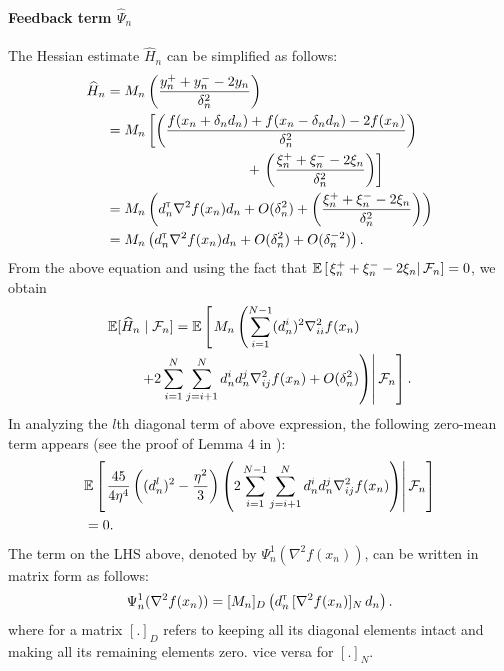 \documentclass[letterpaper, 10 pt, conference]{ieeeconf}  %
\begin{document}
\paragraph{Feedback term $\widehat \Psi_n$}
The Hessian estimate $\widehat H_n$ can be simplified as follows: 
\begin{align}
\widehat H_n & = M_n \left(\dfrac{y_n^+ + y_n^- - 2 y_n}{\delta_n^2}\right) \nonumber \\
& =  M_n \left[\left(\dfrac{f(x_n+\delta_n d_n) + f(x_n-\delta_n d_n) - 2 f(x_n)}{\delta_n^2}\right) \right.\nonumber \\&\hspace{10em}+\left. \left(\dfrac{\xi_n^+ + \xi_n^- - 2 \xi_n}{\delta_n^2}\right)\right] \nonumber \\
& = M_n \left(d_n\tr \nabla^2 f(x_n) d_n +  O(\delta_n^2) + \left(\dfrac{\xi_n^+ + \xi_n^- - 2 \xi_n}{\delta_n^2} \right)\right)\nonumber \\
& = M_n \left(d_n\tr \nabla^2 f(x_n) d_n +  O(\delta_n^2) + O(\delta_n^{-2})\right). \label{eq:h0}
\end{align}
From the above equation and using the fact that $\mathbb{E}\left[\left.\xi_n^+ + \xi_n^- - 2\xi_n \right| \mathcal{F}_n\right] = 0$, we obtain
\begin{align}
&\mathbb{E}[\widehat H_n \mid \mathcal{F}_n] =   \mathbb{E}\left[\left. M_n \left(\sum\limits_{i=1}^{N-1} (d_n^i)^2 \nabla^2_{ii} f(x_n) \right.\right.\right.\nonumber\\
&\qquad\left.\left.\left.+ 2\sum\limits_{i=1}^N\sum\limits_{j=i+1}^N d_n^i d_n^j \nabla^2_{ij} f(x_n) + O(\delta_n^2)\right)\right| \mathcal{F}_n\right]. \label{eq:h1}
\end{align}
In analyzing the $l$th diagonal term of above expression, the following zero-mean term appears (see the proof of Lemma 4 in \cite{prashanth2015rdsa}):
\begin{align*}
& \mathbb{E}\left[\left.\dfrac{45}{4\eta^4} \left((d_n^l)^2-\frac{\eta^2}{3}\right) \left(2\sum\limits_{i=1}^{N-1}\sum\limits_{j=i+1}^N d_n^i d_n^j \nabla^2_{ij} f(x_n)\right)\right| \mathcal{F}_{n}\right]\nonumber \\ &= 0.
\end{align*}
The term on the LHS above, denoted by $\Psi_{n}^{1}(\nabla^2 f(x_n))$, can be written in matrix form as follows: 
\begin{align}\label{eq:digmat}
\Psi_{n}^{1}(\nabla^2 f(x_n)) = [M_n]_{D}\left(d_{n}^\mathsf{\scriptscriptstyle T} \, [\nabla^2 f(x_n)]_{N} \, d_{n}\right).
\end{align}
where for a matrix $[.]_{D}$ refers to keeping all its diagonal elements intact and making all its remaining elements zero. vice versa for $[.]_{N}$.
\end{document}
